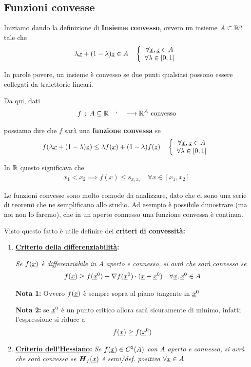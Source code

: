 \subsection{Funzioni convesse}

Iniziamo dando la definizione di \textbf{Insieme convesso}, ovvero un insieme $A\subset \mathbb{R}^n$ tale che
\begin{align}
	\lambda \underline{x} + (1-\lambda)\underline{z} \in A \quad 
	\left\{\begin{array}{cc} \forall \underline{x},\underline{z} \in A \\ \forall \lambda \in [0,1] \end{array}\right.
\end{align}

In parole povere, un insieme è convesso se due punti qualsiasi possono essere collegati da traiettorie lineari.

\bigskip

Da qui, dati
\begin{align}
	f \, : \, A\subseteq \mathbb{R}^{\quad ; \quad} \longrightarrow \mathbb{R}^{A} \text{ convesso}
\end{align}

possiamo dire che $f$ sarà una \textbf{funzione convessa} se
\begin{align}
	f(\lambda \underline{x} + (1-\lambda)\underline{z}) \leq \lambda f(\underline{x}) + (1-\lambda)f(\underline{z}) \quad \left\{\begin{array}{cc} \forall \underline{x},\underline{z} \in A \\ \forall \lambda \in [0,1] \end{array}\right.
\end{align}


In $\mathbb{R}$ questo significava che
\begin{align}
	x_1 < x_2 \implies f(x)\leq s_{x_1 x_2} \quad \forall x\in[x_1,x_2]
\end{align}

Le funzioni convesse sono molto comode da analizzare, dato che ci sono una serie di teoremi che ne semplificano allo studio. Ad esempio è possibile dimostrare (ma noi non lo faremo), che in un aperto connesso una funzione convessa è continua.

Visto questo fatto è utile definire dei \textbf{criteri di convessità:}

\begin{enumerate}
	\item \textbf{\underline{Criterio della differenziabilità}:}
	
	\textit{Se $f(\underline{x})$ è differenziabile in $A$ aperto e connesso, si avrà che sarà convessa se}
	\begin{align}
		f(\underline{x}) \geq f(\underline{x}^0) + \nabla f(\underline{x}^0)\cdot (\underline{x} - \underline{x}^0) \quad \forall \underline{x} , \underline{x}^0 \in A
	\end{align}
	
	\textbf{Nota 1:} Ovvero $f(\underline{x})$ è sempre sopra al piano tangente in $\underline{x}^0$
	
	\textbf{Nota 2:} se $\underline{x}^0$ è un punto critico allora sarà sicuramente di minimo, infatti l'espressione si riduce a
	\begin{align}
		f(\underline{x}) \geq f(\underline{x}^0)
	\end{align}
	
	\item \textbf{\underline{Criterio dell'Hessiano}:}
	\textit{Se $f(\underline{x})\in C^2(A)$ con $A$ aperto e connesso, si avrà che sarà convessa se $\boldsymbol{H}_{f} (\underline{x})$ è semi/def. positiva $\forall \underline{x} \in A$ }
\end{enumerate}

